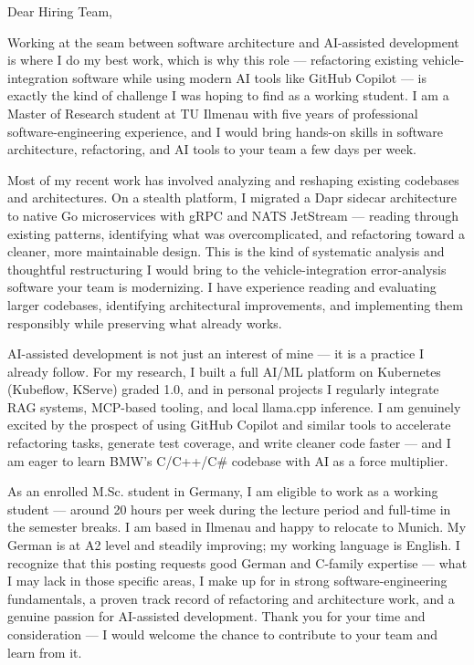\documentclass[11pt,a4paper]{coverletter}
\begin{document}

\opening{Dear Hiring Team,}

Working at the seam between software architecture and AI-assisted development is where I do my best work, which is why this role — refactoring existing vehicle-integration software while using modern AI tools like GitHub Copilot — is exactly the kind of challenge I was hoping to find as a working student. I am a Master of Research student at TU Ilmenau with five years of professional software-engineering experience, and I would bring hands-on skills in software architecture, refactoring, and AI tools to your team a few days per week.

Most of my recent work has involved analyzing and reshaping existing codebases and architectures. On a stealth platform, I migrated a Dapr sidecar architecture to native Go microservices with gRPC and NATS JetStream — reading through existing patterns, identifying what was overcomplicated, and refactoring toward a cleaner, more maintainable design. This is the kind of systematic analysis and thoughtful restructuring I would bring to the vehicle-integration error-analysis software your team is modernizing. I have experience reading and evaluating larger codebases, identifying architectural improvements, and implementing them responsibly while preserving what already works.

AI-assisted development is not just an interest of mine — it is a practice I already follow. For my research, I built a full AI/ML platform on Kubernetes (Kubeflow, KServe) graded 1.0, and in personal projects I regularly integrate RAG systems, MCP-based tooling, and local llama.cpp inference. I am genuinely excited by the prospect of using GitHub Copilot and similar tools to accelerate refactoring tasks, generate test coverage, and write cleaner code faster — and I am eager to learn BMW's C/C++/C\# codebase with AI as a force multiplier.

As an enrolled M.Sc. student in Germany, I am eligible to work as a working student — around 20 hours per week during the lecture period and full-time in the semester breaks. I am based in Ilmenau and happy to relocate to Munich. My German is at A2 level and steadily improving; my working language is English. I recognize that this posting requests good German and C-family expertise — what I may lack in those specific areas, I make up for in strong software-engineering fundamentals, a proven track record of refactoring and architecture work, and a genuine passion for AI-assisted development. Thank you for your time and consideration — I would welcome the chance to contribute to your team and learn from it.
\end{document}
